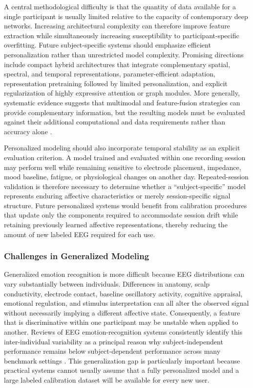 \documentclass{WileyMSP-template}
\begin{document}
A central methodological difficulty is that the quantity of data available for a single participant is usually limited relative to the capacity of contemporary deep networks. Increasing architectural complexity can therefore improve feature extraction while simultaneously increasing susceptibility to participant-specific overfitting. Future subject-specific systems should emphasize efficient personalization rather than unrestricted model complexity. Promising directions include compact hybrid architectures that integrate complementary spatial, spectral, and temporal representations, parameter-efficient adaptation, representation pretraining followed by limited personalization, and explicit regularization of highly expressive attention or graph modules. More generally, systematic evidence suggests that multimodal and feature-fusion strategies can provide complementary information, but the resulting models must be evaluated against their additional computational and data requirements rather than accuracy alone \cite{khare2024systematicemotionai}.

Personalized modeling should also incorporate temporal stability as an explicit evaluation criterion. A model trained and evaluated within one recording session may perform well while remaining sensitive to electrode placement, impedance, mood baseline, fatigue, or physiological changes on another day. Repeated-session validation is therefore necessary to determine whether a ``subject-specific'' model represents enduring affective characteristics or merely session-specific signal structure. Future personalized systems would benefit from calibration procedures that update only the components required to accommodate session drift while retaining previously learned affective representations, thereby reducing the amount of new labeled EEG required for each use.

\subsubsection{Challenges in Generalized Modeling}
\label{subsubsec:generalized_modeling_challenges}

Generalized emotion recognition is more difficult because EEG distributions can vary substantially between individuals. Differences in anatomy, scalp conductivity, electrode contact, baseline oscillatory activity, cognitive appraisal, emotional regulation, and stimulus interpretation can all alter the observed signal without necessarily implying a different affective state. Consequently, a feature that is discriminative within one participant may be unstable when applied to another. Reviews of EEG emotion-recognition systems consistently identify this inter-individual variability as a principal reason why subject-independent performance remains below subject-dependent performance across many benchmark settings \cite{vempati2023automatedeegreview}. This generalization gap is particularly important because practical systems cannot usually assume that a fully personalized model and a large labeled calibration dataset will be available for every new user.
\end{document}
